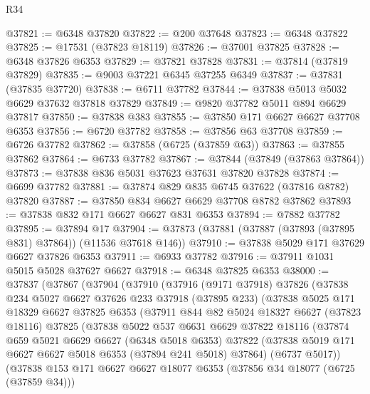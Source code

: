 \begin{lexlean}{R34}
\begin{coremodule}
@37821 := @6348 @37820
@37822 := @200 @37648
@37823 := @6348 @37822
@37825 := @17531 (@37823 @18119)
@37826 := @37001 @37825
@37828 := @6348 @37826 @6353
@37829 := @37821 @37828
@37831 := @37814 (@37819 @37829)
@37835 := @9003 @37221 @6345 @37255 @6349
@37837 := @37831 (@37835 @37720)
@37838 := @6711 @37782
@37844 := @37838 @5013 @5032 @6629 @37632 @37818 @37829
@37849 := @9820 @37782 @5011 @894 @6629 @37817
@37850 := @37838 @383
@37855 := @37850 @171 @6627 @6627 @37708 @6353
@37856 := @6720 @37782
@37858 := @37856 @63 @37708
@37859 := @6726 @37782
@37862 := @37858 (@6725 (@37859 @63))
@37863 := @37855 @37862
@37864 := @6733 @37782
@37867 := @37844 (@37849 (@37863 @37864))
@37873 := @37838 @836 @5031 @37623 @37631 @37820 @37828
@37874 := @6699 @37782
@37881 := @37874 @829 @835 @6745 @37622 (@37816 @8782) @37820
@37887 := @37850 @834 @6627 @6629 @37708 @8782 @37862
@37893 := @37838 @832 @171 @6627 @6627 @831 @6353
@37894 := @7882 @37782
@37895 := @37894 @17
@37904 := @37873 (@37881 (@37887 (@37893 (@37895 @831) @37864)) (@11536 @37618 @146))
@37910 := @37838 @5029 @171 @37629 @6627 @37826 @6353
@37911 := @6933 @37782
@37916 := @37911 @1031 @5015 @5028 @37627 @6627
@37918 := @6348 @37825 @6353
@38000 := @37837
    (@37867
      (@37904
        (@37910
          (@37916
            (@9171 @37918)
            @37826
            (@37838
              @234
              @5027
              @6627
              @37626
              @233
              @37918
              (@37895 @233)
              (@37838
                @5025
                @171
                @18329
                @6627
                @37825
                @6353
                (@37911
                  @844
                  @82
                  @5024
                  @18327
                  @6627
                  (@37823 @18116)
                  @37825
                  (@37838
                    @5022
                    @537
                    @6631
                    @6629
                    @37822
                    @18116
                    (@37874
                      @659
                      @5021
                      @6629
                      @6627
                      (@6348 @5018 @6353)
                      @37822
                      (@37838 @5019 @171 @6627 @6627 @5018 @6353 (@37894 @241 @5018) @37864)
                      (@6737 @5017))
                    (@37838
                      @153
                      @171
                      @6627
                      @6627
                      @18077
                      @6353
                      (@37856 @34 @18077 (@6725 (@37859 @34)))

\end{coremodule}
\end{lexlean}
